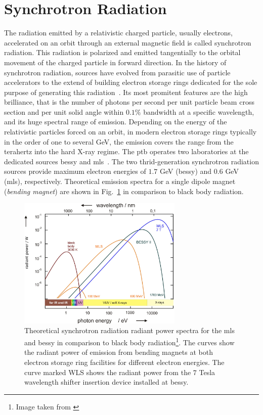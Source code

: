 \section{Synchrotron Radiation}
The radiation emitted by a relativistic charged particle, usually electrons, accelerated on an orbit through an external magnetic field is called synchrotron radiation. This radiation is polarized and emitted tangentially to the orbital movement of the charged particle in forward direction. In the history of synchrotron radiation, sources have evolved from parasitic use of particle accelerators to the extend of building electron storage rings dedicated for the sole purpose of generating this radiation~\cite{munro_chapter_1987}. Its most promitent features are the high brilliance, that is the number of photons per second per unit particle beam cross section and per unit solid angle within $0.1\%$ bandwidth at a specific wavelength, and its huge spectral range of emission. Depending on the energy of the relativistic particles forced on an orbit, in modern electron storage rings typically in the order of one to several GeV, the emission covers the range from the terahertz into the hard X-ray regime. The \gls{ptb} operates two laboratories at the dedicated sources \gls{bessy} and \gls{mls}~\cite{brandt_metrology_2007}. The two thrid-generation synchrotron radiation sources provide maximum electron energies of $1.7$ GeV (\gls{bessy}) and $0.6$ GeV (\gls{mls}), respectively. Theoretical emission spectra for a single dipole magnet (\emph{bending magnet}) are shown in Fig.~\ref{ch_exp:fig_experimental_synchrotron_spectra} in comparison to black body radiation.
\begin{figure}
 \includegraphics[width=0.7\textwidth]{img/exp-bessy-dipole-spectrum.jpeg}
 \caption[Theoretical synchrotron radiation radiant power spectra]{Theoretical synchrotron radiation radiant power spectra for the \gls{mls} and \gls{bessy} in comparison to black body radiation\footnote{Image taken from \textcite{beckhoff_quarter-century_2009}}. The curves show the radiant power of emission from bending magnets at both electron storage ring facilities for different electron energies. The curve marked WLS shows the radiant power from the $7$ Tesla wavelength shifter insertion device installed at \gls{bessy}.}
 \label{ch_exp:fig_experimental_synchrotron_spectra}
\end{figure}

